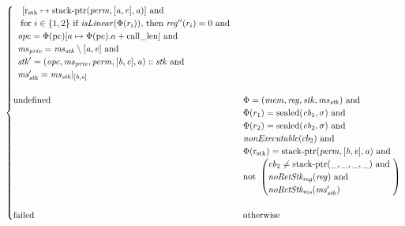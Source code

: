 \documentclass[a4paper]{article}
\newcommand{\update}[2]{[#1 \mapsto #2]}
\newcommand{\shareddom}[1]{\mathrm{#1}}
\newcommand{\perm}{\var{perm}}
\newcommand{\stkptr}[1]{\mathrm{stack\text{-}ptr}(#1)}
\newcommand{\sealed}[1]{\shareddom{sealed}(#1)}
\newcommand{\failed}{\mathrm{failed}}
\newcommand{\tundefined}{\mathrm{undefined}}
\newcommand{\var}[1]{\mathit{#1}}
\newcommand{\reg}{\var{reg}}
\newcommand{\mem}{\var{mem}}
\newcommand{\ms}{\var{ms}}
\newcommand{\stk}{\var{stk}}
\newcommand{\priv}{\var{priv}}
\newcommand{\opc}{\var{opc}}
\newcommand{\cb}{\var{cb}}
\newcommand{\baddr}{\var{b}}
\newcommand{\eaddr}{\var{e}}
\newcommand{\aaddr}{\var{a}}
\newcommand{\stdrng}{[\baddr,\eaddr]}
\newcommand{\constant}[1]{\mathrm{#1}}
\newcommand{\calllen}{\constant{call\_len}}
\newcommand{\pcreg}{\mathrm{pc}}
\newcommand{\rstk}{\mathrm{r}_\mathrm{stk}}
\newcommand{\plainfun}[2]{
  \ifthenelse{\equal{#2}{}}
  {\mathit{#1}}
  {\mathit{#1}(#2)}
}
\newcommand{\nonExec}[1]{\plainfun{nonExecutable}{#1}}
\newcommand{\isLinear}[1]{\plainfun{isLinear}{#1}}
\newcommand{\noRetStkReg}[1]{\plainfun{noRetStk_{reg}}{#1}}
\newcommand{\noRetStkMs}[1]{\plainfun{noRetStk_{ms}}{#1}}
\begin{document}
\begin{align*}
\begin{cases}
\begin{array}[t]{l}
\begin{array}[t]{l}
                                        \update{\rstk}{\stkptr{\perm,[\aaddr,\eaddr],\aaddr}} \text{ and }
                                        \end{array}
\\                                        \text{ for $i \in \{1,2\}$ if $\isLinear{\Phi(r_i)}$, then $\reg''(r_i) = 0$ and} \\
                                        \opc = \Phi(\pcreg)\update{a}{\Phi(\pcreg).a+\calllen} \text{ and } \\
                                        \ms_\priv = \ms_\stk \setminus [\aaddr,\eaddr] \text{ and } \\
                                        \stk' = (\opc,\ms_\priv,\perm,\stdrng,\aaddr) :: \stk \text{ and } \\
                                        \ms_\stk' = \ms_\stk |_{[\baddr,\eaddr]}
                                      \end{array}\\
                                      & \\
      \tundefined & \arraycolsep=0pt
                                      \begin{array}[t]{l}
                                        \Phi = (\mem,\reg,\stk,\ms_\stk) \text{ and } \\
                                        \Phi(r_1) = \sealed{\cb_1,\sigma} \text{ and } \\
                                        \Phi(r_2) = \sealed{\cb_2,\sigma} \text{ and } \\
                                        \nonExec{cb_2} \text{ and } \\
                                        \Phi(\rstk) = \stkptr{\perm, \stdrng, \aaddr} \text{ and } \\
                                        \text{not } \arraycolsep=0pt
                                        \left(\begin{array}{l}
                                          \cb_2 \neq \stkptr{\_,\_,\_,\_} \text{ and } \\
                                          \noRetStkReg{\reg} \text{ and } \\
                                          \noRetStkMs{\ms_\stk'}
                                        \end{array} \right)
                                      \end{array}\\
                                      & \\
      \failed & \text{otherwise}
    \end{cases}
\end{align*}
\end{document}
